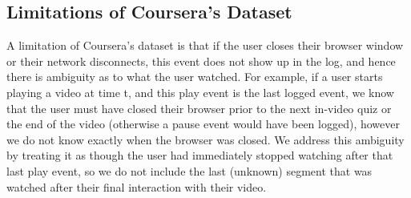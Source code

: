 \documentclass{sigchi}
\begin{document}
\subsection{Limitations of Coursera's Dataset}

A limitation of Coursera's dataset is that if the user closes their browser window or their network disconnects, this event does not show up in the log, and hence there is ambiguity as to what the user watched. For example, if a user starts playing a video at time t, and this play event is the last logged event, we know that the user must have closed their browser prior to the next in-video quiz or the end of the video (otherwise a pause event would have been logged), however we do not know exactly when the browser was closed. We address this ambiguity by treating it as though the user had immediately stopped watching after that last play event, so we do not include the last (unknown) segment that was watched after their final interaction with their video. %





\end{document}

